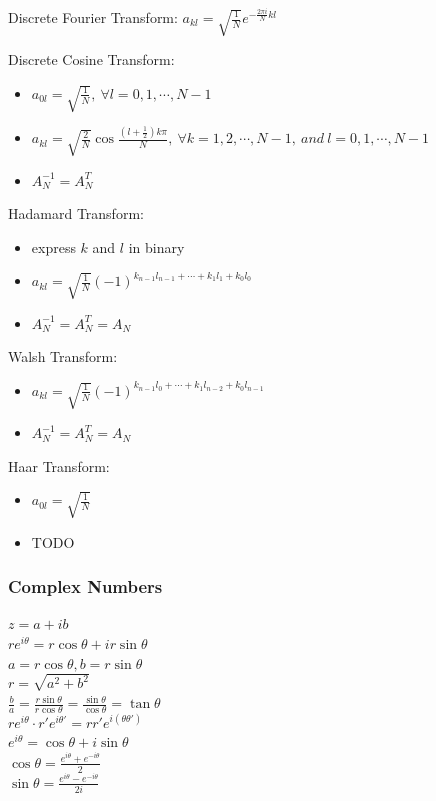 Discrete Fourier Transform: $a_{kl}=\sqrt{\frac{1}{N}}e^{-\frac{2\pi i}{N}kl}$

Discrete Cosine Transform:
\begin{itemize}
    \item $a_{0l}=\sqrt{\frac{1}{N}},\ \forall l=0,1,\cdots,N-1$
    \item $a_{kl}=\sqrt{\frac{2}{N}}\cos\frac{(l+\frac{1}{2})k\pi}{N},\ \forall k=1,2,\cdots,N-1,\ and\ l=0,1,\cdots, N-1$
    \item $A_N^{-1}=A_N^T$
\end{itemize}

Hadamard Transform:
\begin{itemize}
    \item express $k$ and $l$ in binary
    \item $a_{kl}=\sqrt{\frac{1}{N}}(-1)^{k_{n-1}l_{n-1}+\cdots+k_1l_1+k_0l_0}$
    \item $A_N^{-1}=A_N^T=A_N$
\end{itemize}

Walsh Transform:
\begin{itemize}
    \item $a_{kl}=\sqrt{\frac{1}{N}}(-1)^{k_{n-1}l_{0}+\cdots+k_1l_{n-2}+k_0l_{n-1}}$
    \item $A_N^{-1}=A_N^T=A_N$
\end{itemize}

Haar Transform:
\begin{itemize}
    \item $a_{0l}=\sqrt{\frac{1}{N}}$
    \item TODO
\end{itemize}

\subsubsection*{Complex Numbers}
$z=a+ib$\\
$re^{i\theta}=r\cos\theta+ir\sin\theta$\\
$a=r\cos\theta,b=r\sin\theta$\\
$r=\sqrt{a^2+b^2}$\\
$\frac{b}{a}=\frac{r\sin\theta}{r\cos\theta}=\frac{\sin\theta}{\cos\theta}=\tan\theta$\\
$re^{i\theta}\cdot r'e^{i\theta'}=rr'e^{i(\theta\theta')}$\\
$e^{i\theta}=\cos\theta+i\sin\theta$\\
$\cos\theta=\frac{e^{i\theta}+e^{-i\theta}}{2}$\\
$\sin\theta=\frac{e^{i\theta}-e^{-i\theta}}{2i}$

